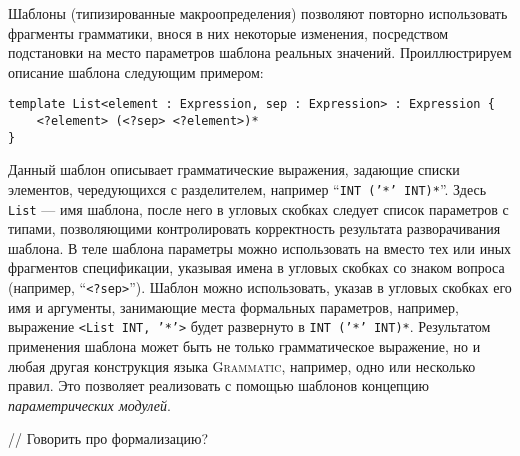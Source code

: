 \documentclass[12pt,a4paper]{article}
\newcommand{\term}[1]{\emph{#1}}
\newcommand{\code}[1]{\mbox{\texttt{#1}}}
\newcommand{\tool}[1]{\textsc{#1}}
\theoremstyle{definition}
\theoremstyle{plain}
\begin{document}
Шаблоны (типизированные макроопределения) позволяют повторно использовать фрагменты грамматики, внося в них некоторые изменения, посредством подстановки на место параметров шаблона реальных значений. Проиллюстрируем описание шаблона следующим примером:
\begin{lstlisting}
template List<element : Expression, sep : Expression> : Expression {
	<?element> (<?sep> <?element>)*
}
\end{lstlisting}
Данный шаблон описывает грамматические выражения, задающие списки элементов, чередующихся с разделителем, например ``\code{INT ('*' INT)*}''. Здесь \code{List} --- имя шаблона, после него в угловых скобках следует список параметров с типами, позволяющими контролировать корректность результата разворачивания шаблона. В теле шаблона параметры можно использовать на вместо тех или иных фрагментов спецификации, указывая имена в угловых скобках со знаком вопроса (например, ``\code{<?sep>}''). Шаблон можно использовать, указав в угловых скобках его имя и аргументы, занимающие места формальных параметров, например, выражение \code{<List INT, '*'>} будет развернуто в \code{INT ('*' INT)*}. Результатом применения шаблона может быть не только грамматическое выражение, но и любая другая конструкция языка \tool{Grammatic}, например, одно или несколько правил. Это позволяет реализовать с помощью шаблонов концепцию \term{параметрических модулей}. 

// Говорить про формализацию?
\end{document}
